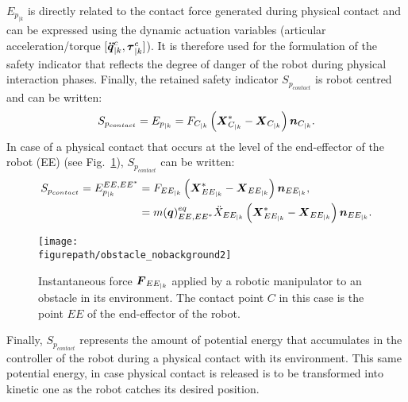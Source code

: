 $E_{p_{|k}}$ is directly related to the contact force generated during physical contact and can be expressed using the dynamic actuation variables (articular acceleration/torque $[\mbox{\boldmath${\ddot{q}}$}_{|k}^{c}, \mbox{\boldmath${\tau}$}_{|k}^{c}]$). It is therefore used for the formulation of the safety indicator that reflects the degree of danger of the robot during physical interaction phases. Finally, the retained safety indicator $S_{p_{contact}}$ is robot centred and can be written:
\begin{equation}
S_{p_{contact}} = E_{p_{|k}} = F_{C_{|k}} \left(\mbox{\boldmath${X}$}_{C_{|k}}^{*} - \mbox{\boldmath${X}$}_{C_{|k}}\right) \mbox{\boldmath${n}$}_{C_{|k}}.
\end{equation}
In case of a physical contact that occurs at the level of the end-effector of the robot (EE) (see Fig.~\ref{fig:small_dist_rob_obst2}), $S_{p_{contact}}$ can be written:   
\vspace{-1 mm}
\begin{equation}
\begin{split}
S_{p_{contact}} = E_{p_{|k}}^{EE,EE^*} &= F_{EE_{|k}}\left(\mbox{\boldmath${X}$}_{EE_{|k}}^{*} - \mbox{\boldmath${X}$}_{EE_{|k}}\right) \mbox{\boldmath${n}$}_{EE_{|k}} ,
\\
&= m(\mbox{\boldmath${q}$})_{EE,EE^*}^{eq} \ddot{X}_{EE_{|k}} \left(\mbox{\boldmath${X}$}_{EE_{|k}}^{*} - \mbox{\boldmath${X}$}_{EE_{|k}}\right) \mbox{\boldmath${n}$}_{EE_{|k}}.
\end{split}
\label{eq:Ep_constr_221}
\end{equation}
\vspace{-5mm}
\begin{figure}[H]
\captionsetup{width=1\linewidth}
\centering
\texttt{[image: \\figurepath/obstacle\_nobackground2]}
\caption{Instantaneous force $\mbox{\boldmath${F}$}_{EE_{|k}}$ applied by a robotic manipulator to an obstacle in its environment. The contact point $C$ in this case is the point $EE$ of the end-effector of the robot.}
\label{fig:small_dist_rob_obst2}
\end{figure}
\vspace{-1mm}
Finally, $S_{p_{contact}}$ represents the amount of potential energy that accumulates in the controller of the robot during a physical contact with its environment. This same potential energy, in case physical contact is released is to be transformed into kinetic one as the robot catches its desired position.
